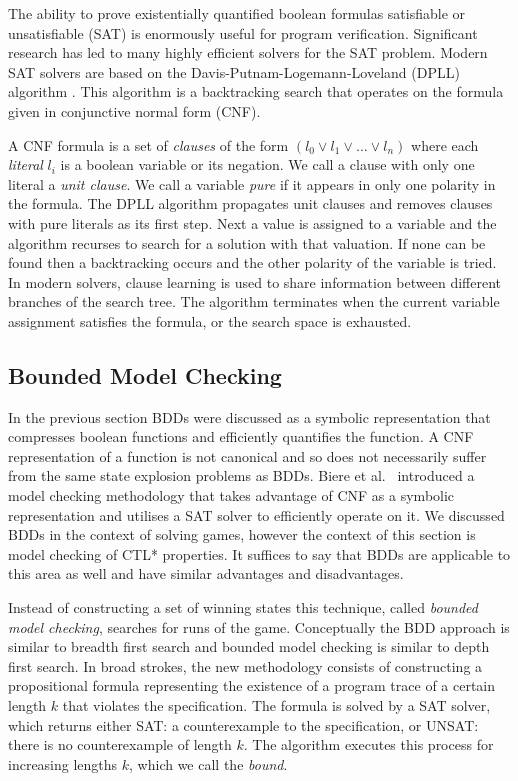 The ability to prove existentially quantified boolean formulas satisfiable or
unsatisfiable (SAT) is enormously useful for program verification. Significant
research has led to many highly efficient solvers for the SAT problem. Modern
SAT solvers are based on the Davis-Putnam-Logemann-Loveland (DPLL) algorithm
\cite{Davis60, Davis62}. This algorithm is a backtracking search that operates
on the formula given in conjunctive normal form (CNF).

A CNF formula is a set of \emph{clauses} of the form $(l_0 \lor l_1 \lor ...
\lor l_n)$ where each \emph{literal} $l_i$ is a boolean variable or its
negation. We call a clause with only one literal a \emph{unit clause}. We call
a variable \emph{pure} if it appears in only one polarity in the formula. The
DPLL algorithm propagates unit clauses and removes clauses with pure literals
as its first step. Next a value is assigned to a variable and the algorithm recurses to search for a solution with that valuation. If none can be found then a backtracking occurs and the other polarity of the variable is tried. In modern solvers, clause learning is used to share information between different branches of the search tree. The algorithm terminates when the current variable assignment satisfies the formula, or the search space is exhausted.

\subsection{Bounded Model Checking}
\label{sec:boundedmodelchecking}

In the previous section BDDs were discussed as a symbolic representation that compresses boolean functions and efficiently quantifies the function. A CNF representation of a function is not canonical and so does not necessarily suffer from the same state explosion problems as BDDs. Biere et al.~\cite{Biere99} introduced a model checking methodology that takes advantage of CNF as a symbolic representation and utilises a SAT solver to efficiently operate on it. We discussed BDDs in the context of solving games, however the context of this section is model checking of CTL* properties. It suffices to say that BDDs are applicable to this area as well and have similar advantages and disadvantages.

Instead of constructing a set of winning states this technique, called \emph{bounded model checking}, searches for runs of the game. Conceptually the BDD approach is similar to breadth first search and bounded model checking is similar to depth first search. In broad strokes, the new methodology consists of constructing a propositional formula representing the existence of a program trace of a certain length $k$ that violates the specification. The formula is solved by a SAT solver, which returns either SAT: a counterexample to the specification, or UNSAT: there is no counterexample of length $k$. The algorithm executes this process for increasing lengths $k$, which we call the \emph{bound}.


